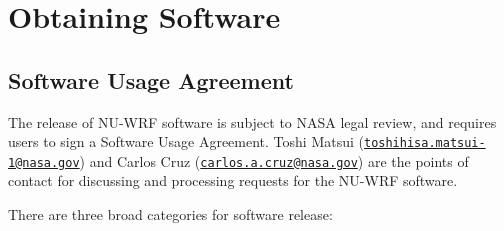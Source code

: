 \section{Obtaining Software}
\label{sec:Obtaining}

\subsection{Software Usage Agreement}

The release of NU-WRF software is subject to NASA legal review, and requires
users to sign a Software Usage Agreement. Toshi Matsui 
(\href{mailto:toshihisa.matsui-1@nasa.gov}
{\texttt{toshihisa.matsui-1@nasa.gov}}) and 
Carlos Cruz (\href{mailto:carlos.a.cruz@nasa.gov}{\texttt{carlos.a.cruz@nasa.gov}}) 
are the points of contact for discussing and processing requests for the NU-WRF
software.

There are three broad categories for software release:

